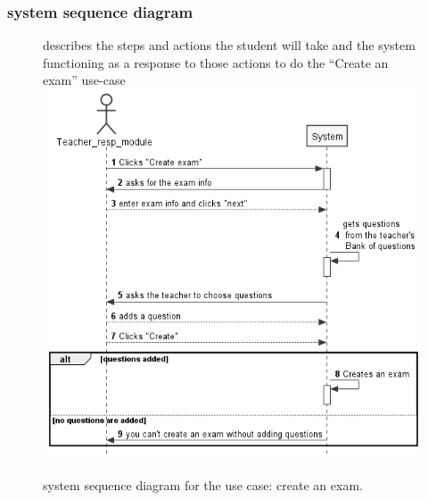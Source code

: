 \documentclass[]{uc2pfecaneva}
\begin{document}
    \subsubsection{system sequence diagram}
    \begin{figure}[h]
        describes the steps and actions the student will take and the system functioning as a response
        to those actions to do the “Create an exam” use-case
        \centering
        \includegraphics[width=\textwidth]{images/Create_Exam}

        \caption{system sequence diagram for the use case: create an exam.}
    \end{figure}
    \clearpage
\end{document}
